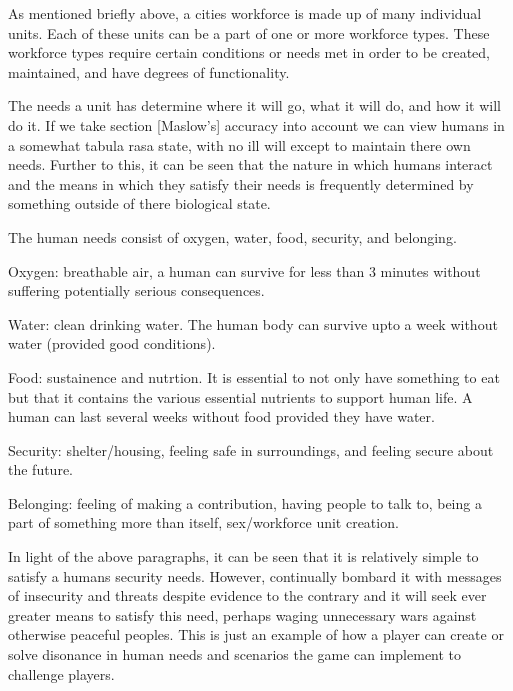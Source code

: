 As mentioned briefly above, a cities workforce is made up of many individual units. Each of these units can be a part of one or more workforce types. These workforce types require certain conditions or needs met in order to be created, maintained, and have degrees of functionality. 

The needs a unit has determine where it will go, what it will do, and how it will do it. If we take section [Maslow's] accuracy into account we can view humans in a somewhat tabula rasa state, with no ill will except to maintain there own needs. Further to this, it can be seen that the nature in which humans interact and the means in which they satisfy their needs is frequently determined by something outside of there biological state. 

The human needs consist of oxygen, water, food, security, and belonging.



Oxygen: breathable air, a human can survive for less than 3 minutes without suffering potentially serious consequences. 

Water: clean drinking water. The human body can survive upto a week without water (provided good conditions). 

Food: sustainence and nutrtion. It is essential to not only have something to eat but that it contains the various essential nutrients to support human life. A human can last several weeks without food provided they have water.

Security: shelter/housing, feeling safe in surroundings, and feeling secure about the future.

Belonging: feeling of making a contribution, having people to talk to, being a part of something more than itself, sex/workforce unit creation.



In light of the above paragraphs, it can be seen that it is relatively simple to satisfy a humans security needs. However, continually bombard it with messages of insecurity and threats despite evidence to the contrary and it will seek ever greater means to satisfy this need, perhaps waging unnecessary wars against otherwise peaceful peoples. This is just an example of how a player can create or solve disonance in human needs and scenarios the game can implement to challenge players.










